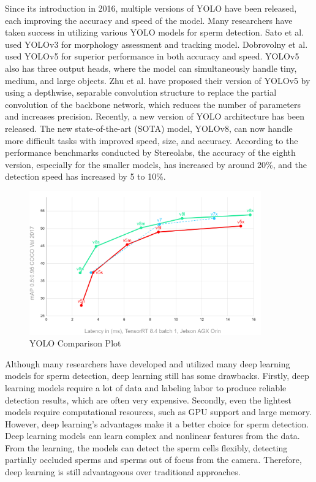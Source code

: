 Since its introduction in 2016, multiple versions of YOLO have been released, each improving the accuracy and speed of the model. Many researchers have taken success in utilizing various YOLO models for sperm detection. Sato et al. used YOLOv3 for morphology assessment and tracking model. \cite{deep5} Dobrovolny et al. used YOLOv5 for superior performance in both accuracy and speed. \cite{deep6} YOLOv5 also has three output heads, where the model can simultaneously handle tiny, medium, and large objects. \cite{deep6} Zhu et al. have proposed their version of YOLOv5 by using a depthwise, separable convolution structure to replace the partial convolution of the backbone network, which reduces the number of parameters and increases precision. \cite{deep7}
\newpage
Recently, a new version of YOLO architecture has been released. The new state-of-the-art (SOTA) model, YOLOv8, can now handle more difficult tasks with improved speed, size, and accuracy. \cite{deep8} According to the performance benchmarks conducted by Stereolabs, the accuracy of the eighth version, especially for the smaller models, has increased by around 20\%, and the detection speed has increased by 5 to 10\%. \cite{deep9} 

\begin{figure}[h]
\centering
\includegraphics[width=10cm]{Images/YOLO Comparison Chart.png}
\caption{YOLO Comparison Plot \cite{deep9}}
\label{yolocomp}
\end{figure}

Although many researchers have developed and utilized many deep learning models for sperm detection, deep learning still has some drawbacks. Firstly, deep learning models require a lot of data and labeling labor to produce reliable detection results, which are often very expensive. Secondly, even the lightest models require computational resources, such as GPU support and large memory. However, deep learning's advantages make it a better choice for sperm detection. Deep learning models can learn complex and nonlinear features from the data. From the learning, the models can detect the sperm cells flexibly, detecting partially occluded sperms and sperms out of focus from the camera. Therefore, deep learning is still advantageous over traditional approaches.
\newpage
